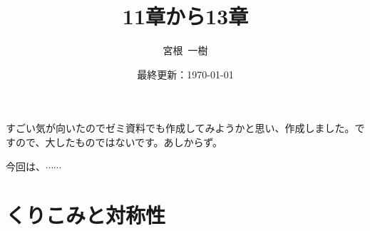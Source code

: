 \documentclass[unicode,a4paper,11pt]{ltjsarticle}
\title{
  11章から13章
}
\author{
  宮根\ 一樹
}
\date{最終更新：\today}
\begin{document}
\maketitle
\tableofcontents

\vspace*{10pt}

すごい気が向いたのでゼミ資料でも作成してみようかと思い、作成しました。ですので、大したものではないです。あしからず。

今回は、$\cdots\cdots$


\clearpage
\section{くりこみと対称性}
\end{document}
